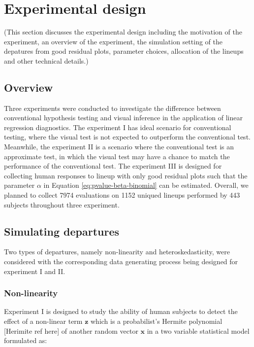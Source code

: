 \documentclass[]{interact}
\theoremstyle{plain}%
\theoremstyle{definition}
\theoremstyle{remark}
\begin{document}
\hypertarget{experimental-design}{%
\section{Experimental design}\label{experimental-design}}

(This section discusses the experimental design including the motivation
of the experiment, an overview of the experiment, the simulation setting
of the depatures from good residual plots, parameter choices, allocation
of the lineups and other technical details.)

\hypertarget{overview}{%
\subsection{Overview}\label{overview}}

Three experiments were conducted to investigate the difference between
conventional hypothesis testing and visual inference in the application
of linear regression diagnostics. The experiment I has ideal scenario
for conventional testing, where the visual test is not expected to
outperform the conventional test. Meanwhile, the experiment II is a
scenario where the conventional test is an approximate test, in which
the visual test may have a chance to match the performance of the
conventional test. The experiment III is designed for collecting human
responses to lineup with only good residual plots such that the
parameter \(\alpha\) in Equation \ref{eq:pvalue-beta-binomial} can be
estimated. Overall, we planned to collect 7974 evaluations on 1152
uniqued lineups performed by 443 subjects throughout three experiment.

\hypertarget{simulating-departures}{%
\subsection{Simulating departures}\label{simulating-departures}}

Two types of departures, namely non-linearity and heteroskedasticity,
were considered with the corresponding data generating process being
designed for experiment I and II.

\hypertarget{non-linearity}{%
\subsubsection{Non-linearity}\label{non-linearity}}

Experiment I is designed to study the ability of human subjects to
detect the effect of a non-linear term \(\boldsymbol{z}\) which is a
probabilist's Hermite polynomial {[}Herimite ref here{]} of another
random vector \(\boldsymbol{x}\) in a two variable statistical model
formulated as:
\end{document}
